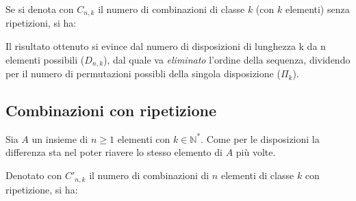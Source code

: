 \vspace{10px}
Se si denota con \(C_{n,k}\) il numero di combinazioni di classe \(k\) (con \(k\) elementi) senza ripetizioni, si ha:
\begin{center}
\end{center}

Il risultato ottenuto si evince dal numero di disposizioni di lunghezza k da n elementi possibili (\(D_{n,k}\)), dal quale va \textit{eliminato} l'ordine della sequenza, dividendo per il numero di permutazioni possibli della singola disposizione (\(\Pi_k\)).

\subsection{Combinazioni con ripetizione}
Sia \(A\) un insieme di \(n\geq 1\) elementi con \(k\in \mathbb{N}^*\). Come per le disposizioni la differenza sta nel poter riavere lo stesso elemento di \(A\) più volte.

\vspace{10px}
Denotato con \(C'_{n,k}\) il numero di combinazioni di \(n\) elementi di classe \(k\) con ripetizione, si ha:
\begin{center}
\end{center}
